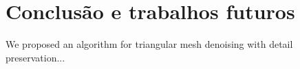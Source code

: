 \chapter{Conclusão e trabalhos futuros}
\label{cha:Conclusão}

We proposed an algorithm for triangular mesh denoising with detail preservation...

